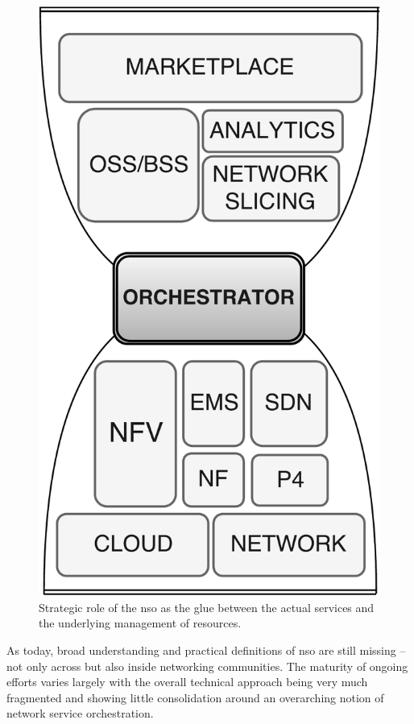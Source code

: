 \begin{figure}[t!]
  \centering
  \includegraphics[scale=.2]{Figures/01_Introduction/orchestrator.pdf}
    \caption{Strategic role of the \gls{nso} as the glue between the actual services and the underlying management of resources.}
    \label{orch}
\end{figure}

As today, broad understanding and practical definitions of \gls{nso} are still missing -- not only across but also inside networking communities. The maturity of ongoing efforts varies largely with the overall technical approach being very much fragmented and showing little consolidation around an overarching notion of network service orchestration. 

